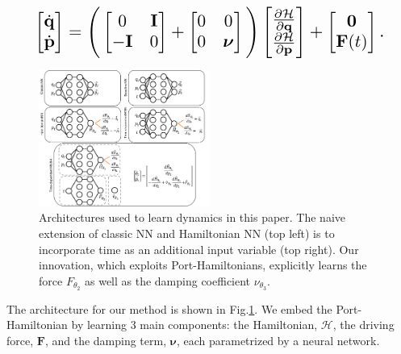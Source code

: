 \documentclass{article}
\begin{document}
\begin{equation}
\resizebox{0.9\linewidth}{!}{$%
\begin{bmatrix}
\dot{\mathbf{q}} \\
\dot{\mathbf{p}}
\end{bmatrix}
=
\Bigg(\begin{bmatrix}
0 & \mathbf{I} \\
-\mathbf{I} & 0
\end{bmatrix} +
\begin{bmatrix}
0 & 0 \\
0 & \boldsymbol\nu
\end{bmatrix}
 \Bigg)
 \begin{bmatrix}
\frac{\partial \mathcal{H}}{\partial \mathbf{q}} \\
\frac{\partial \mathcal{H}}{\partial \mathbf{p}}
\end{bmatrix}
+
\begin{bmatrix}
\mathbf{0} \\
\mathbf{F}(t)
\end{bmatrix}.
$%
}%
\label{eqn.pham1}
\end{equation}
\begin{figure}[h!]
\centering
\includegraphics[width=0.5\textwidth]{figures/architecture1.pdf}
\caption{Architectures used to learn dynamics in this paper. The naive extension of classic NN and Hamiltonian NN (top left) is to incorporate time as an additional input variable (top right). Our innovation, which exploits Port-Hamiltonians, explicitly learns the force $F_{\theta_2}$ as well as the damping coefficient $\nu_{\theta_3}$.}
\label{fig.architecture}
\end{figure}

The architecture for our method is shown in Fig.\ref{fig.architecture}. We embed the Port-Hamiltonian by learning 3 main components: the Hamiltonian, $\mathcal{H}$, the driving force, $\mathbf{F}$, and the damping term, $\boldsymbol\nu$, each parametrized by a neural network.
\end{document}

